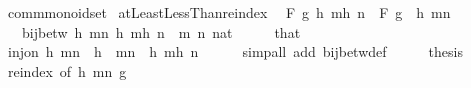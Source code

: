 \begin{isabellebody}
\isanewline
\isanewline
{}\isamarkupfalse%
\ comm{\isacharunderscore}{\kern0pt}monoid{\isacharunderscore}{\kern0pt}set\isanewline
{}\isanewline
\isanewline
{}\isamarkupfalse%
\ atLeastLessThan{\isacharunderscore}{\kern0pt}reindex{\isacharcolon}{\kern0pt}\isanewline
\ \ {\isachardoublequoteopen}F\ g\ {\isacharbraceleft}{\kern0pt}h\ m{\isachardot}{\kern0pt}{\isachardot}{\kern0pt}{\isacharless}{\kern0pt}h\ n{\isacharbraceright}{\kern0pt}\ {\isacharequal}{\kern0pt}\ F\ {\isacharparenleft}{\kern0pt}g\ {\isasymcirc}\ h{\isacharparenright}{\kern0pt}\ {\isacharbraceleft}{\kern0pt}m{\isachardot}{\kern0pt}{\isachardot}{\kern0pt}{\isacharless}{\kern0pt}n{\isacharbraceright}{\kern0pt}{\isachardoublequoteclose}\isanewline
\ \ \ {\isachardoublequoteopen}bij{\isacharunderscore}{\kern0pt}betw\ h\ {\isacharbraceleft}{\kern0pt}m{\isachardot}{\kern0pt}{\isachardot}{\kern0pt}{\isacharless}{\kern0pt}n{\isacharbraceright}{\kern0pt}\ {\isacharbraceleft}{\kern0pt}h\ m{\isachardot}{\kern0pt}{\isachardot}{\kern0pt}{\isacharless}{\kern0pt}h\ n{\isacharbraceright}{\kern0pt}{\isachardoublequoteclose}\ \ m\ n\ {\isacharcolon}{\kern0pt}{\isacharcolon}{\kern0pt}nat\isanewline
%
\isadelimproof
%
\endisadelimproof
%
\isatagproof
{}\isamarkupfalse%
\ {\isacharminus}{\kern0pt}\isanewline
\ \ \isamarkupfalse%
\ that\ \isamarkupfalse%
\ {\isachardoublequoteopen}inj{\isacharunderscore}{\kern0pt}on\ h\ {\isacharbraceleft}{\kern0pt}m{\isachardot}{\kern0pt}{\isachardot}{\kern0pt}{\isacharless}{\kern0pt}n{\isacharbraceright}{\kern0pt}{\isachardoublequoteclose}\ \ {\isachardoublequoteopen}h\ {\isacharbackquote}{\kern0pt}\ {\isacharbraceleft}{\kern0pt}m{\isachardot}{\kern0pt}{\isachardot}{\kern0pt}{\isacharless}{\kern0pt}n{\isacharbraceright}{\kern0pt}\ {\isacharequal}{\kern0pt}\ {\isacharbraceleft}{\kern0pt}h\ m{\isachardot}{\kern0pt}{\isachardot}{\kern0pt}{\isacharless}{\kern0pt}h\ n{\isacharbraceright}{\kern0pt}{\isachardoublequoteclose}\isanewline
\ \ \ \ \isamarkupfalse%
\ {\isacharparenleft}{\kern0pt}simp{\isacharunderscore}{\kern0pt}all\ add{\isacharcolon}{\kern0pt}\ bij{\isacharunderscore}{\kern0pt}betw{\isacharunderscore}{\kern0pt}def{\isacharparenright}{\kern0pt}\isanewline
\ \ \isamarkupfalse%
\ \isamarkupfalse%
\ {\isacharquery}{\kern0pt}thesis\isanewline
\ \ \ \ \isamarkupfalse%
\ reindex\ {\isacharbrackleft}{\kern0pt}of\ h\ {\isachardoublequoteopen}{\isacharbraceleft}{\kern0pt}m{\isachardot}{\kern0pt}{\isachardot}{\kern0pt}{\isacharless}{\kern0pt}n{\isacharbraceright}{\kern0pt}{\isachardoublequoteclose}\ g{\isacharbrackright}{\kern0pt}\ \isamarkupfalse%

\end{isabellebody}
